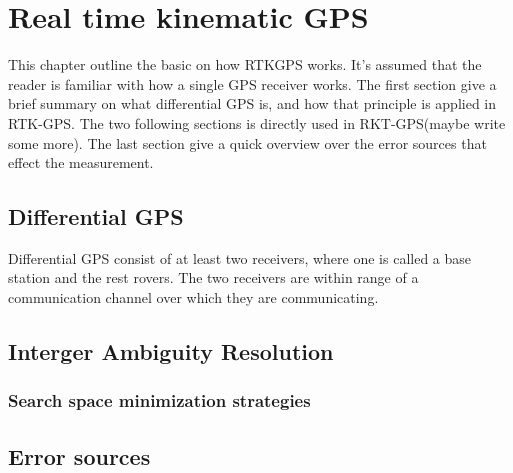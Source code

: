 
\chapter{Real time kinematic GPS}
This chapter outline the basic on how RTKGPS works. It's assumed that the reader is familiar with how a single GPS receiver works. The first section give a brief summary on what differential GPS is, and how that principle is applied in RTK-GPS. The two following sections is directly used in RKT-GPS(maybe write some more). The last section give a quick overview over the error sources that effect the measurement.
\section{Differential GPS}
Differential GPS consist of at least two receivers, where one is called a base station and the rest rovers. The two receivers are within range of a communication channel over which they are communicating. 
\section{Interger Ambiguity Resolution}
\subsection{Search space minimization strategies}
\section{Error sources}


\cleardoublepage